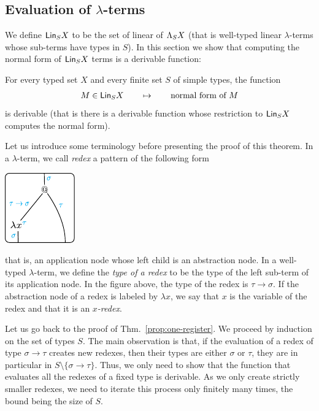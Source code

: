 \subsection{Evaluation of $\lambda$-terms}\label{sec:evaluation-lambda}

We define $\mathsf{Lin}_{S} X$ to be the set of linear \lambdaterms of $\Lambda_{S} X$ (that is well-typed linear $\lambda$-terms whose sub-terms have types in $S$).
In this section we show that computing the normal form of $\mathsf{Lin}_{S} X$ terms  is a derivable function:

 \begin{theorem}\label{prop:one-register} 
    For every typed set $X$ and every finite set $S$ of simple types, the function 
    \begin{align*}
        M \in  \mathsf{Lin}_{S} X \qquad \mapsto \qquad \text{normal form of $M$} 
    \end{align*}
    is derivable (that is there is a derivable function whose restriction to $\mathsf{Lin}_{S} X$ computes the normal form). 
\end{theorem}


Let us introduce some terminology before presenting the proof of this theorem. In a $\lambda$-term, we call \emph{redex} a pattern of the following form 
\begin{center}
\includegraphics[scale=1.2]{pictures/redex.pdf}
\end{center}
that is, an application node whose left child is an abstraction node. In a well-typed $\lambda$-term, we define the \emph{type of a redex} to be the type of the left sub-term of its application node. In the figure above, the type of the redex is $\tau\rightarrow\sigma$. If the abstraction node of a redex is labeled by $\lambda x$, we say that $x$ is the variable of the redex and that it is an \emph{$x$-redex}. 

Let us go back to the proof of Thm.~\ref{prop:one-register}. We proceed by induction on the set of types $S$. The main observation is that, if the evaluation of a redex of type $\sigma\rightarrow \tau$ creates new redexes, then their types are either $\sigma$ or $\tau$, they are in particular in $S\setminus\{\sigma\rightarrow\tau\}$. Thus, we only need to show that the function that evaluates all the redexes of a fixed type is derivable. As we only create strictly smaller redexes, we need to iterate this process only finitely many times, the bound being the size of $S$. 

